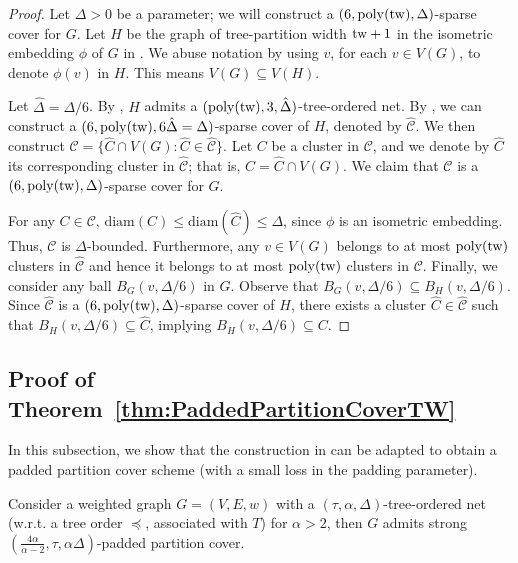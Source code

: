 \documentclass{theoretics}
\newcommand{\tw}{{\rm tw}}
\newcommand{\poly}{\mathrm{poly}}
\newcommand{\diam}{\mathrm{diam}}
\begin{document}
\CoverTWTheorem*
\begin{proof}
Let $\Delta > 0$ be a parameter; we will construct a $(6,\poly(\tw),\Delta)$-sparse cover for $G$. Let $H$ be the graph of tree-partition width $\tw+1$ in the isometric embedding $\phi$ of $G$ in . We abuse notation by using $v$,  for each $v\in V(G)$, to denote $\phi(v)$ in $H$. This means $V(G) \subseteq V(H)$. 

Let $\hat{\Delta} = \Delta/6$. By , $H$ admits a $(\poly(\tw), 3,\hat{\Delta})$-tree-ordered net. By , we can construct a $(6, \poly(\tw), 6\hat{\Delta} = \Delta)$-sparse cover of $H$, denoted by $\hat{\mathcal{C}}$. We then construct $\mathcal{C} = \{\hat{C}\cap V(G): \hat{C}\in \hat{\mathcal{C}}\}$.  Let $C$ be a cluster in $\mathcal{C}$, and we denote by $\hat{C}$ its corresponding cluster in $\hat{\mathcal{C}}$; that is, $C = \hat{C}\cap V(G)$. We claim that $\mathcal{C}$ is  a $(6,\poly(\tw),\Delta)$-sparse cover for $G$.  

For any $C\in \mathcal{C}$, $\diam(C)\leq \diam(\hat{C}) \leq \Delta$, since $\phi$ is an isometric embedding. Thus, $\mathcal{C}$ is $\Delta$-bounded. Furthermore, any $v\in V(G)$ belongs to at most $\poly(\tw)$ clusters in $\mathcal{\hat{C}}$ and hence it belongs to at most  $\poly(\tw)$ clusters  in $\mathcal{C}$. Finally, we consider any ball $B_G(v,\Delta/6)$ in $G$. Observe that $B_G(v,\Delta/6)\subseteq B_H(v,\Delta/6)$. Since $\hat{\mathcal{C}}$ is a $(6, \poly(\tw), \Delta)$-sparse cover of $H$, there exists a cluster $\hat{C} \in \hat{\mathcal{C}}$ such that $B_H(v,\Delta/6)\subseteq \hat{C}$, implying $B_H(v,\Delta/6)\subseteq C$.
\end{proof} 

\subsection{Proof of Theorem~\ref{thm:PaddedPartitionCoverTW}}\label{subsec:PaddedCover}

In this subsection, we show that the construction in  can be adapted to obtain a padded partition cover scheme (with a small loss in the padding parameter).

\begin{lemma}\label{lem:NetToCoverUnionPartitions}
	Consider a weighted graph $G=(V,E,w)$ with a $(\tau,\alpha,\Delta)$-tree-ordered net (w.r.t. a tree order $\preceq$, associated with $T$) for $\alpha>2$, then 
	$G$ admits strong 
	 $(\frac{4\alpha}{\alpha-2},\tau,\alpha\Delta)$-padded partition cover.	
\end{lemma}
\end{document}
